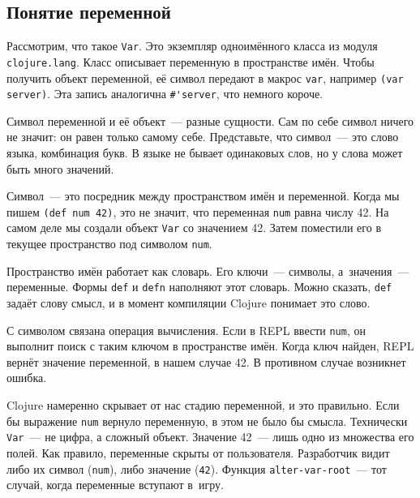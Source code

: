 \subsection{Понятие переменной}

\label{var-section}


Рассмотрим, что такое \verb|Var|. Это экземпляр одноимённого класса из модуля
\verb|clojure.lang|. Класс описывает переменную в пространстве имён.  Чтобы
получить объект переменной, её символ передают в макрос \verb|var|, например
\verb|(var server)|. Эта запись аналогична \verb|#'server|, что немного короче.



Символ переменной и её объект~--- разные сущности. Сам по себе
символ ничего не значит: он равен только самому себе. Представьте, что символ~---
это слово языка, комбинация букв. В языке не бывает одинаковых слов, но у
слова может быть много значений.


Символ~--- это посредник между пространством имён и переменной. Когда мы пишем
\verb|(def num 42)|, это не значит, что переменная \verb|num| равна числу
42. На самом деле мы создали объект \verb|Var| со значением 42. Затем
поместили его в текущее пространство под символом \verb|num|.

Пространство имён работает как словарь. Его ключи~--- символы, а~значения~---
переменные. Формы \verb|def| и \verb|defn| наполняют этот словарь. Можно
сказать, \verb|def| задаёт слову смысл, и в момент компиляции Clojure
понимает это слово.

С символом связана операция вычисления. Если в REPL ввести \verb|num|,
он выполнит поиск с таким ключом в пространстве имён. Когда ключ найден, REPL
вернёт значение переменной, в нашем случае 42. В противном случае возникнет
ошибка.

Clojure намеренно скрывает от нас стадию переменной, и это правильно. Если бы
выражение \verb|num| вернуло переменную, в этом не было бы смысла. Технически
\verb|Var|~--- не цифра, а сложный объект. Значение 42~--- лишь одно из
множества его полей. Как правило, переменные скрыты от пользователя. Разработчик
видит либо их символ (\verb|num|), либо значение (\verb|42|). Функция
\verb|alter-var-root|~--- тот случай, когда переменные вступают в~игру.

